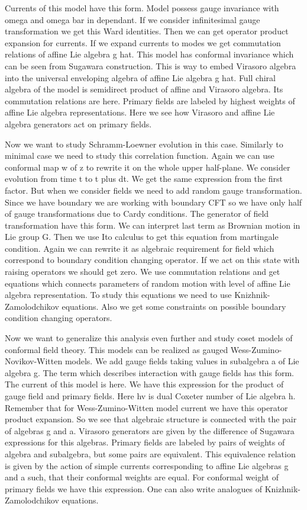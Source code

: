 \documentclass{article}
\begin{document}
Currents of this model have this form. 
Model possess gauge invariance with omega and omega bar in dependant. If we consider infinitesimal gauge transformation we get this Ward identities. Then we can get operator product expansion for currents. 
If we expand currents to modes we get commutation relations of affine Lie algebra g hat. 
This model has conformal invariance which can be seen from 
Sugawara construction. This is way to embed Virasoro algebra into the universal enveloping algebra of affine Lie algebra g hat. 
Full chiral algebra of the model is semidirect product of affine and Virasoro algebra. Its commutation relations are here. 
Primary fields are labeled by highest weights of affine Lie algebra representations. Here we see how Virasoro and affine Lie algebra generators act on primary fields.

Now we want to study Schramm-Loewner evolution in this case. Similarly to minimal case we need to study this correlation function. 
Again we can use conformal map w of z to rewrite it on the whole upper half-plane. 
We consider evolution from time t to t plus dt. We get the same expression from the first factor. But when we consider fields we need to add random gauge transformation. 
Since we have boundary we are working with boundary CFT so we have only half of gauge transformations due to Cardy conditions. The generator of field transformation have this form. We can interpret last term as Brownian motion in Lie group G.
Then we use Ito calculus to get this equation from martingale condition. Again we can rewrite it as algebraic requirement for  field  which correspond to boundary condition changing operator.
If we act on this state with raising operators we should get zero. We use commutation relations and get equations which connects parameters of random motion with level of affine Lie algebra representation. To study this equations we need to use Knizhnik-Zamolodchikov equations. Also we get some constraints on possible boundary condition changing operators. 

Now we want to generalize this analysis even further and study coset models of conformal field theory. This models can be realized as gauged Wess-Zumino-Novikov-Witten models. We add gauge fields taking values in subalgebra a of Lie algebra g. The term which describes interaction with gauge fields has this form. 
The current of this model is here. 
We have this expression for the product of gauge field and primary fields. Here hv is dual Coxeter number of Lie algebra h.
Remember that for Wess-Zumino-Witten model current we have this operator product expansion. So we see that algebraic structure is connected with the pair of algebras g and a. Virasoro generators are given by the difference of Sugawara expressions for this algebras. 
Primary fields are labeled by pairs of weights of algebra and subalgebra, but some pairs are equivalent. This equivalence relation is given by the action of simple currents corresponding to affine Lie algebras g and a such, that their conformal weights are equal. 
For conformal weight of primary fields we have this expression. 
One can also write analogues of Knizhnik-Zamolodchikov equations.
\end{document}
